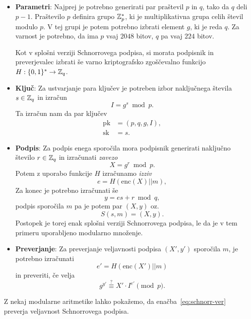 \begin{itemize}
    \item \textbf{Parametri}:
    Najprej je potrebno generirati par praštevil $p$ in $q$, tako da $q$ deli $p - 1$. Praštevilo $p$
    definira grupo $\mathbb Z_p^*$, ki je multiplikativna grupa celih števil modulo $p$. V tej grupi je potem
    potrebno izbrati element $g$, ki je reda $q$. Za varnost je potrebno, da ima $p$ vsaj $2048$ bitov,
    $q$ pa vsaj $224$ bitov.

    Kot v splošni verziji Schnorrovega podpisa, si morata podpisnik in preverjevalec izbrati še varno
    kriptografsko zgoščevalno funkcijo $H : \{0, 1\}^* \rightarrow \mathbb Z_q$.

    \item \textbf{Ključ}:
    Za ustvarjanje para ključev je potreben izbor naključnega števila $s \in \mathbb Z_q$
    in izračun 
    $$ 
    I = g^s \bmod p.
    $$
    Ta izračun nam da par ključev
    \begin{align*}
    \text{pk} &= (p, q, g, I), \\
    \text{sk} &= s.
    \end{align*}

    \item \textbf{Podpis}:
    Za podpis enega sporočila mora podpisnik generirati naključno število $r \in \mathbb Z_q$ in izračunati
    \textit{zavezo}
    $$ 
    X = g^r \bmod p.
    $$ 
    Potem z uporabo funkcije $H$ izračunamo \textit{izziv} 
    $$
    e = H(\text{enc}(X) || m),
    $$
    Za konec je potrebno izračunati še 
    $$ 
    y = es + r \bmod q, 
    $$
    podpis sporočila $m$ pa je potem par $(X, y)$ oz.\ 
    $$ 
    S(s, m) = (X, y).
    $$
    Postopek je torej enak splošni verziji Schnorrovega podpisa, le da je v tem primeru uporabljeno
    modularno množenje.

    \item \textbf{Preverjanje}:
    Za preverjanje veljavnosti podpisa $(X', y')$ sporočila $m$, je potrebno izračunati 
    $$ 
    e' = H(\text{enc}(X') || m)
    $$
    in preveriti, če velja 
    \begin{equation}
        g^{y'} \stackrel{?}{\equiv} X' \cdot I^{e'} \pmod p. \label{eq:schnorr-ver}
    \end{equation}
\end{itemize}

Z nekaj modularne aritmetike lahko pokažemo, da enačba~\eqref{eq:schnorr-ver} preverja veljavnost
Schnorrovega podpisa.

